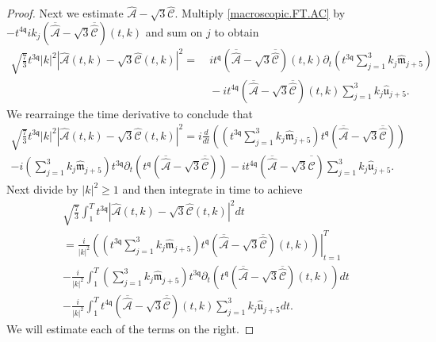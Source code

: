 \documentclass[10pt,a4paper]{amsart}
\newcommand{\qq}{\mathfrak{q}}
\newcommand{\tTq}{t^{3\qq}}
\newcommand{\tq}{t^{\qq}}
\begin{document}
\begin{proof}
Next we estimate $\widehat{\mathcal{A}}- \sqrt{3}\widehat{\mathcal{C}}$.  Multiply \eqref{macroscopic.FT.AC} by $-t^{4\qq} ik_j  \left( \overline{\widehat{\mathcal{A}}}- \sqrt{3}\overline{\widehat{\mathcal{C}}}\right)(t,k)$ and sum on $j$ to obtain
\begin{align*}
\sqrt{\frac{7}{3}}\tTq |k|^2   \left|\widehat{\mathcal{A}}(t,k)- \sqrt{3}\widehat{\mathcal{C}}(t,k)\right|^2
= &~ 
 i \tq\left( \overline{\widehat{\mathcal{A}}}- \sqrt{3}\overline{\widehat{\mathcal{C}}}\right)(t,k)\partial_t \left(\tTq\sum_{j=1}^3 k_j    \widehat{\mathfrak{m}}_{j+5} \right)
\\
&~
-
i t^{4\qq}\left( \overline{\widehat{\mathcal{A}}}- \sqrt{3}\overline{\widehat{\mathcal{C}}}\right)(t,k)  \sum_{j=1}^3 k_j\hat{\mathfrak{u}}_{j+5}.
\end{align*}
We rearrainge the time derivative to conclude that
\begin{multline*}
\sqrt{\frac{7}{3}}\tTq |k|^2   \left|\widehat{\mathcal{A}}(t,k)- \sqrt{3}\widehat{\mathcal{C}}(t,k)\right|^2
=   i \frac{d}{dt} \left(  \left(\tTq\sum_{j=1}^3 k_j    \widehat{\mathfrak{m}}_{j+5} \right)\tq\left( \overline{\widehat{\mathcal{A}}}- \sqrt{3}\overline{\widehat{\mathcal{C}}}\right) \right)
\\
-
i  \left( \sum_{j=1}^3 k_j    \widehat{\mathfrak{m}}_{j+5} \right) \tTq\partial_t  \left(\tq\left( \overline{\widehat{\mathcal{A}}}- \sqrt{3}\overline{\widehat{\mathcal{C}}}\right)\right)
-
i t^{4\qq}\left( \overline{\widehat{\mathcal{A}}}- \sqrt{3}\overline{\widehat{\mathcal{C}}}\right)  \sum_{j=1}^3 k_j\hat{\mathfrak{u}}_{j+5}.
\end{multline*}
Next divide by $|k|^2 \ge 1$ and then integrate in time to achieve
\begin{multline*}
\sqrt{\frac{7}{3}}\int_1^{T} \tTq \left|\widehat{\mathcal{A}}(t,k)- \sqrt{3}\widehat{\mathcal{C}}(t,k)\right|^2  dt
\\
=
\left. \frac{i}{|k|^2} \left(  \left(\tTq\sum_{j=1}^3 k_j    \widehat{\mathfrak{m}}_{j+5} \right)\tq\left( \overline{\widehat{\mathcal{A}}}- \sqrt{3}\overline{\widehat{\mathcal{C}}}\right)(t,k) \right)\right|_{t=1}^T
\\
-
\frac{i}{|k|^2} \int_1^{T} \left( \sum_{j=1}^3 k_j    \widehat{\mathfrak{m}}_{j+5} \right) \tTq\partial_t  \left(\tq\left( \overline{\widehat{\mathcal{A}}}- \sqrt{3}\overline{\widehat{\mathcal{C}}}\right)(t,k)\right) dt
\\
-
\frac{i}{|k|^2} \int_1^{T} t^{4\qq}\left( \overline{\widehat{\mathcal{A}}}- \sqrt{3}\overline{\widehat{\mathcal{C}}}\right)(t,k)  \sum_{j=1}^3 k_j\hat{\mathfrak{u}}_{j+5} dt.
\end{multline*}
We will estimate each of the terms on the right.  


\end{proof}
\end{document}
